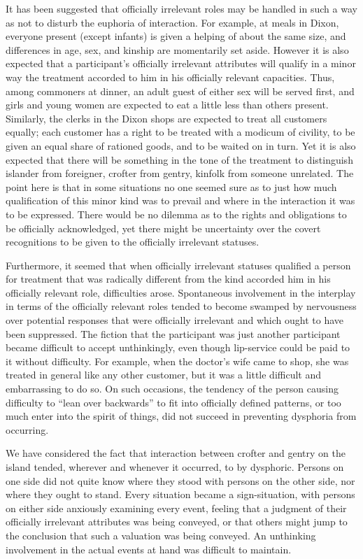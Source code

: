 \documentclass[twoside,symmetric,nobib,justified]{tufte-book}
\begin{document}
It has been suggested that officially irrelevant roles may be handled in
such a way as not to disturb the euphoria of interaction. For example,
at meals in Dixon, everyone present (except infants) is given a helping
of about the same size, and differences in age, sex, and kinship are
momentarily set aside. However it is also expected that a participant's
officially irrelevant attributes will qualify in a minor way the
treatment accorded to him in his officially relevant capacities. Thus,
among commoners at dinner, an adult guest of either sex will be served
first, and girls and young women are expected to eat a little less than
others present. Similarly, the clerks in the Dixon shops are expected to
treat all customers equally; each customer has a right to be treated
with a modicum of civility, to be given an equal share of rationed
goods, and to be waited on in turn. Yet it is also expected that there
will be something in the tone of the treatment to distinguish islander
from foreigner, crofter from gentry, kinfolk from someone unrelated. The
point here is that in some situations no one seemed sure as to just how
much qualification of this minor kind was to prevail and where in the
interaction it was to be expressed. There would be no dilemma as to the
rights and obligations to be officially acknowledged, yet there might be
uncertainty over the covert recognitions to be given to the officially
irrelevant statuses.

Furthermore, it seemed that when officially irrelevant statuses
qualified a person for treatment that was radically different from the
kind accorded him in his officially relevant role, difficulties arose.
Spontaneous involvement in the interplay in terms of the officially
relevant roles tended to become swamped by nervousness over potential
responses that were officially irrelevant and which ought to have been
suppressed. The fiction that the participant was just another
participant became difficult to accept unthinkingly, even though
lip-service could be paid to it without difficulty. For example, when
the doctor's wife came to shop, she was treated in general like any
other customer, but it was a little difficult and embarrassing to do so.
On such occasions, the tendency of the person causing difficulty to
``lean over backwards'' to fit into officially defined patterns, or too
much enter into the spirit of things, did not succeed in preventing
dysphoria from occurring.

We have considered the fact that interaction between crofter and gentry
on the island tended, wherever and whenever it occurred, to by
dysphoric. Persons on one side did not quite know where they stood with
persons on the other side, nor where they ought to stand. Every
situation became a sign-situation, with persons on either side anxiously
examining every event, feeling that a judgment of their officially
irrelevant attributes was being conveyed, or that others might jump to
the conclusion that such a valuation was being conveyed. An unthinking
involvement in the actual events at hand was difficult to maintain.
\end{document}
